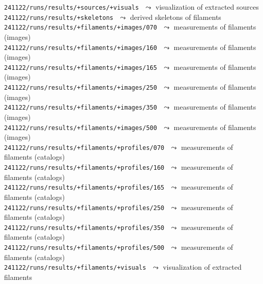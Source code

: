 \documentclass[a4paper,10pt]{article}
\begin{document}
{\small\verb!241122/runs/results/+sources/+visuals!} $\,\,\leadsto$ visualization of extracted sources\\
{\small\verb!241122/runs/results/+skeletons!} $\,\,\leadsto$ derived skeletons of filaments\\
{\small\verb!241122/runs/results/+filaments/+images/070!} $\,\,\leadsto$ measurements of filaments (images)\\
{\small\verb!241122/runs/results/+filaments/+images/160!} $\,\,\leadsto$ measurements of filaments (images)\\
{\small\verb!241122/runs/results/+filaments/+images/165!} $\,\,\leadsto$ measurements of filaments (images)\\
{\small\verb!241122/runs/results/+filaments/+images/250!} $\,\,\leadsto$ measurements of filaments (images)\\
{\small\verb!241122/runs/results/+filaments/+images/350!} $\,\,\leadsto$ measurements of filaments (images)\\
{\small\verb!241122/runs/results/+filaments/+images/500!} $\,\,\leadsto$ measurements of filaments (images)\\
{\small\verb!241122/runs/results/+filaments/+profiles/070!} $\,\,\leadsto$ measurements of filaments (catalogs)\\
{\small\verb!241122/runs/results/+filaments/+profiles/160!} $\,\,\leadsto$ measurements of filaments (catalogs)\\
{\small\verb!241122/runs/results/+filaments/+profiles/165!} $\,\,\leadsto$ measurements of filaments (catalogs)\\
{\small\verb!241122/runs/results/+filaments/+profiles/250!} $\,\,\leadsto$ measurements of filaments (catalogs)\\
{\small\verb!241122/runs/results/+filaments/+profiles/350!} $\,\,\leadsto$ measurements of filaments (catalogs)\\
{\small\verb!241122/runs/results/+filaments/+profiles/500!} $\,\,\leadsto$ measurements of filaments (catalogs)\\
{\small\verb!241122/runs/results/+filaments/+visuals!} $\,\,\leadsto$ visualization of extracted filaments
\end{document}
